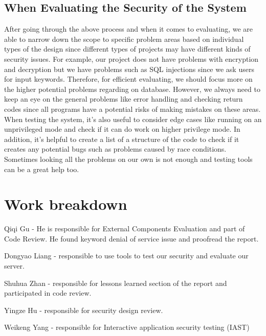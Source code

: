 \documentclass[12pt, a4paper]{article}
\begin{document}
\subsection{When Evaluating the Security of the System}
After going through the above process and when it comes to evaluating, we are able to narrow down the scope to specific problem areas based on individual types of the design since different types of projects may have different kinds of security issues. For example, our project does not have problems with encryption and decryption but we have problems such as SQL injections since we ask users for input keywords. Therefore, for efficient evaluating, we should focus more on the higher potential problems regarding on database. However, we always need to keep an eye on the general problems like error handling and checking return codes since all programs have a potential risks of making mistakes on these areas. When testing the system, it's also useful to consider edge cases like running on an unprivileged mode and check if it can do work on higher privilege mode. In addition, it's helpful to create a list of a structure of the code to check if it creates any potential bugs such as problems caused by race conditions. Sometimes looking all the problems on our own is not enough and testing tools can be a great help too.

\section{Work breakdown}
Qiqi Gu - He is responsible for External Components Evaluation and part of Code Review. He found keyword denial of service issue and proofread the report.

Dongyao Liang - responsible to use tools to test our security and evaluate our server.

Shuhua Zhan - responsible for lessons learned section of the report and participated in code review. 

Yingze Hu - responsible for security design review.

Weikeng Yang - responsible for Interactive application security testing (IAST)
\end{document}
